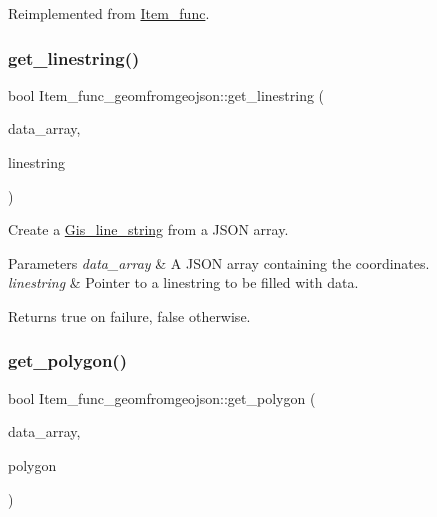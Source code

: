 Reimplemented from \mbox{\hyperlink{classItem__func}{Item\+\_\+func}}.

\mbox{\label{classItem__func__geomfromgeojson_a6efe39ca6db7dde406a9fcfeda0e9785}} 
\subsubsection{\texorpdfstring{get\+\_\+linestring()}{get\_linestring()}}
{\footnotesize\ttfamily bool Item\+\_\+func\+\_\+geomfromgeojson\+::get\+\_\+linestring (\begin{DoxyParamCaption}\item[{const \mbox{\hyperlink{classJson__array}{Json\+\_\+array}} $\ast$}]{data\+\_\+array,  }\item[{\mbox{\hyperlink{classGis__line__string}{Gis\+\_\+line\+\_\+string}} $\ast$}]{linestring }\end{DoxyParamCaption})}

Create a \mbox{\hyperlink{classGis__line__string}{Gis\+\_\+line\+\_\+string}} from a J\+S\+ON array.


\begin{DoxyParams}{Parameters}
{\em data\+\_\+array} & A J\+S\+ON array containing the coordinates. \\
\hline
{\em linestring} & Pointer to a linestring to be filled with data.\\
\hline
\end{DoxyParams}
\begin{DoxyReturn}{Returns}
true on failure, false otherwise. 
\end{DoxyReturn}
\mbox{\label{classItem__func__geomfromgeojson_aac50a4b63ae602d0952446af07181c86}} 
\subsubsection{\texorpdfstring{get\+\_\+polygon()}{get\_polygon()}}
{\footnotesize\ttfamily bool Item\+\_\+func\+\_\+geomfromgeojson\+::get\+\_\+polygon (\begin{DoxyParamCaption}\item[{const \mbox{\hyperlink{classJson__array}{Json\+\_\+array}} $\ast$}]{data\+\_\+array,  }\item[{\mbox{\hyperlink{classGis__polygon}{Gis\+\_\+polygon}} $\ast$}]{polygon }\end{DoxyParamCaption})}

